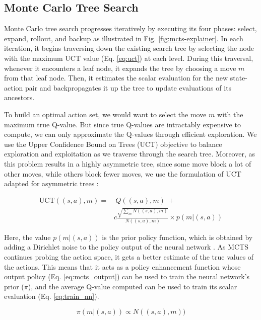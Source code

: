 \subsection{\label{sec:method-mcts} Monte Carlo Tree Search}

Monte Carlo tree search progresses iteratively by executing its four phases: select, expand, rollout, and backup as illustrated in Fig. \ref{fig:mcts-explainer}. In each iteration, it begins traversing down the existing search tree by selecting the node with the maximum UCT value (Eq. \ref{eq:uct}) at each level. During this traversal, whenever it encounters a leaf node, it expands the tree by choosing a move $m$ from that leaf node. Then, it estimates the scalar evaluation for the new state-action pair and backpropagates it up the tree to update evaluations of its ancestors.

To build an optimal action set, we would want to select the move $m$ with the maximum true Q-value. But since true Q-values are intractably expensive to compute, we can only approximate the Q-values through efficient exploration. We use the Upper Confidence Bound on Trees (UCT) objective \cite{mcts_uct} to balance exploration and exploitation as we traverse through the search tree. Moreover, as this problem results in a highly asymmetric tree, since some move block a lot of other moves, while others block fewer moves, we use the formulation of UCT adapted for asymmetric trees \cite{mcts_assymetric}:

\begin{equation}\label{eq:uct}
\begin{split}
    \textrm{UCT}((s,a), m) =&\ Q((s,a), m)\ + \\ & c \frac{\sqrt{\sum_m N((s,a), m)}}{N((s,a), m)} \times p(m \vert (s,a))
\end{split}
\end{equation}

Here, the value $p(m | (s,a))$ is the prior policy function, which is obtained by adding a Dirichlet noise to the policy output of the neural network \cite{mcts_alphazero}. As MCTS continues probing the action space, it gets a better estimate of the true values of the actions. This means that it acts as a policy enhancement function whose output policy (Eq. \ref{eq:mcts_output}) can be used to train the neural network's prior ($\pi$), and the average Q-value computed can be used to train its scalar evaluation (Eq. \ref{eq:train_nn}).

\begin{equation}\label{eq:mcts_output}
    \pi(m | (s,a)) \propto N((s, a), m))
\end{equation}

